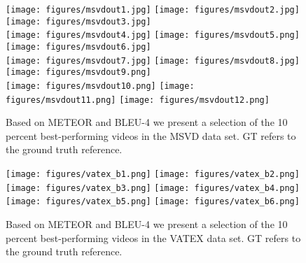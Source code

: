 \documentclass[runningheads,table]{llncs}
\begin{document}
\begin{figure*}
    \centering

    \texttt{[image: figures/msvdout1.jpg]}
    \texttt{[image: figures/msvdout2.jpg]}
    \texttt{[image: figures/msvdout3.jpg]}
    \\
    \texttt{[image: figures/msvdout4.jpg]}
    \texttt{[image: figures/msvdout5.png]}
    \texttt{[image: figures/msvdout6.jpg]}
    \\
    \texttt{[image: figures/msvdout7.jpg]}
    \texttt{[image: figures/msvdout8.jpg]}
    \texttt{[image: figures/msvdout9.png]}
    \\
    \texttt{[image: figures/msvdout10.png]}
    \texttt{[image: figures/msvdout11.png]}
    \texttt{[image: figures/msvdout12.png]}
    \\
      
    \caption{Based on METEOR and BLEU-4 we present a selection of the 10 percent best-performing videos in the  MSVD data set. GT refers to the ground truth reference.
}
    \label{fig:best-outmsvd}
\end{figure*}

\begin{figure*}
    \centering

    \texttt{[image: figures/vatex\_b1.png]}
    \texttt{[image: figures/vatex\_b2.png]}
    \\
    \texttt{[image: figures/vatex\_b3.png]}
    \texttt{[image: figures/vatex\_b4.png]}
    \\
    \texttt{[image: figures/vatex\_b5.png]}
    \texttt{[image: figures/vatex\_b6.png]}
    \\
      
    \caption{Based on METEOR and BLEU-4 we present a selection of the 10 percent best-performing videos in the  VATEX data set. GT refers to the ground truth reference.
   }\label{fig:best-outvatex}
\end{figure*}
\end{document}
